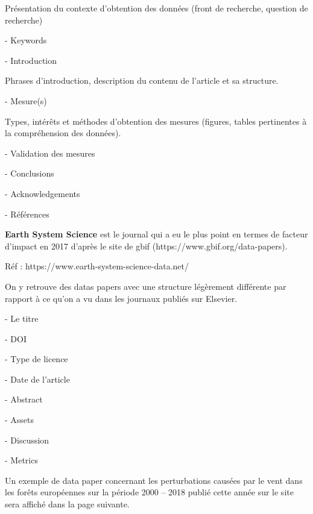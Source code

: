 \documentclass[11pt,oneside]{article}
\begin{document}
\begin{flushleft}
Présentation du contexte d’obtention des données (front de recherche, question de recherche)
\end{flushleft}

-	Keywords

-	Introduction

\begin{flushleft}
Phrases d’introduction, description du contenu de l’article et sa structure.
\end{flushleft}

-	Mesure(s)

\begin{flushleft}
Types, intérêts et méthodes d’obtention des mesures (figures, tables pertinentes à la compréhension des données).
\end{flushleft}

-	Validation des mesures

-	Conclusions

-	Acknowledgements

-	Références

\newpage
\begin{flushleft}
\textbf{Earth System Science} est le journal qui a eu le plus point en termes de facteur d’impact en 2017 d’après le site de gbif (https://www.gbif.org/data-papers).
\end{flushleft}

\begin{flushleft}
Réf : https://www.earth-system-science-data.net/
\end{flushleft}

\begin{flushleft}
On y retrouve des datas papers avec une structure légèrement différente par rapport à ce qu’on a vu dans les journaux publiés sur Elsevier.
\end{flushleft}

-	Le titre

-	DOI

-	Type de licence

-	Date de l’article

-	Abstract

-	Assets

-	Discussion

-	Metrics

\begin{flushleft}
Un exemple de data paper concernant les perturbations causées par le vent dans les forêts européennes sur la période 2000 – 2018 publié cette année sur le site sera affiché dans la page suivante.
\end{flushleft}
\end{document}
